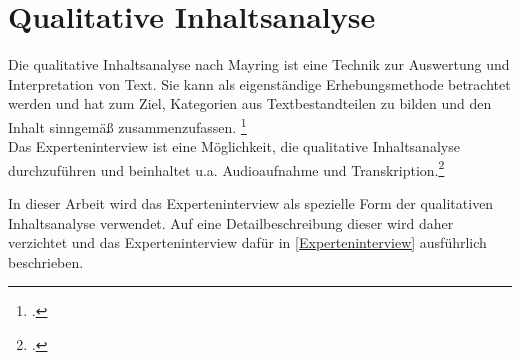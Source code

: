 \section{Qualitative Inhaltsanalyse}


Die qualitative Inhaltsanalyse nach Mayring ist eine Technik zur Auswertung und Interpretation von Text. Sie kann als eigenständige Erhebungsmethode betrachtet werden und hat zum Ziel, Kategorien aus Textbestandteilen zu bilden und den Inhalt sinngemäß zusammenzufassen. \footcite[Vgl.][S. 671]{Mayring_2009_qualitative_Inhaltsanalyse}\\
Das Experteninterview ist eine Möglichkeit, die qualitative Inhaltsanalyse durchzuführen und beinhaltet u.a. Audioaufnahme und Transkription.\footcite[Vgl.][S. 673 f.]{Mayring_2009_qualitative_Inhaltsanalyse}

In dieser Arbeit wird das Experteninterview als spezielle Form der qualitativen Inhaltsanalyse verwendet. Auf eine Detailbeschreibung dieser wird daher verzichtet und das Experteninterview dafür in \autoref{Experteninterview} ausführlich beschrieben.
